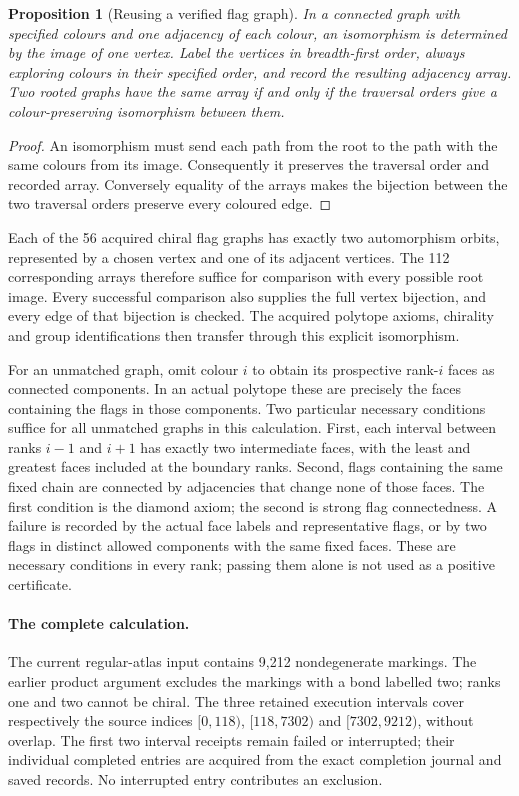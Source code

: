 \documentclass[11pt,a4paper]{article}
\newtheorem{proposition}{Proposition}
\begin{document}
\begin{proposition}[Reusing a verified flag graph]
In a connected graph with specified colours and one adjacency of each
colour, an isomorphism is determined by the image of one vertex. Label
the vertices in breadth-first order, always exploring colours in their
specified order, and record the resulting adjacency array. Two rooted
graphs have the same array if and only if the traversal orders give a
colour-preserving isomorphism between them.
\end{proposition}
\begin{proof}
An isomorphism must send each path from the root to the path with the
same colours from its image. Consequently it preserves the traversal
order and recorded array. Conversely equality of the arrays makes the
bijection between the two traversal orders preserve every coloured edge.
\end{proof}
Each of the 56 acquired chiral flag graphs has exactly two automorphism
orbits, represented by a chosen vertex and one of its adjacent vertices.
The 112 corresponding arrays therefore suffice for comparison with
every possible root image. Every successful comparison also supplies
the full vertex bijection, and every edge of that bijection is checked.
The acquired polytope axioms, chirality and group identifications then
transfer through this explicit isomorphism.

For an unmatched graph, omit colour $i$ to obtain its prospective
rank-$i$ faces as connected components. In an actual polytope these
are precisely the faces containing the flags in those components.
Two particular necessary conditions suffice for all unmatched graphs
in this calculation. First, each interval between ranks $i-1$ and $i+1$
has exactly two intermediate faces, with the least and greatest faces
included at the boundary ranks. Second, flags containing the same fixed
chain are connected by adjacencies that change none of those faces.
The first condition is the diamond axiom; the second is strong flag
connectedness. A failure is recorded by the actual face labels and
representative flags, or by two flags in distinct allowed components
with the same fixed faces. These are necessary conditions in every
rank; passing them alone is not used as a positive certificate.

\paragraph{The complete calculation.}
The current regular-atlas input contains 9,212 nondegenerate markings.
The earlier product argument excludes the markings with a bond labelled
two; ranks one and two cannot be chiral. The three retained execution
intervals cover respectively the source indices
$[0,118)$, $[118,7302)$ and $[7302,9212)$, without overlap.
The first two interval receipts remain failed or interrupted; their
individual completed entries are acquired from the exact completion
journal and saved records. No interrupted entry contributes an exclusion.
\end{document}
